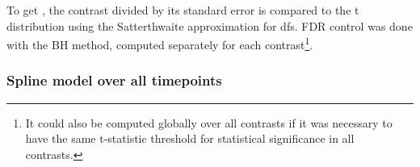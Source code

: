 \begin{outline}
%
% 
To get \pvalues, the contrast divided by its standard error is compared to the t distribution using the Satterthwaite approximation for \glspl{df}.
\gls{FDR} control was done with the \gls{BH} method, computed separately for each contrast\footnote{
It could also be computed globally over all contrasts if it was necessary to have the same t-statistic threshold for statistical significance in all contrasts.
}.


\subsubsection{Spline model over all timepoints}



\end{outline}
